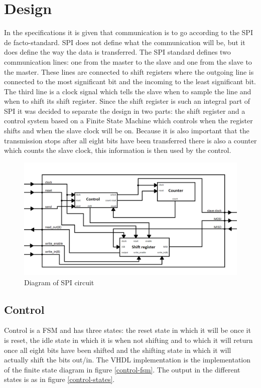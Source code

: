 \documentclass[11pt,twoside,a4paper]{article}
\begin{document}
\section{Design}
In the specifications it is given that communication is to go according to the SPI de facto-standard. SPI does not define what the communication will be, but it does define the way the data is transferred. The SPI standard defines two communication lines: one from the master to the slave and one from the slave to the master. These lines are connected to shift registers where the outgoing line is connected to the most significant bit and the incoming to the least significant bit. The third line is a clock signal which tells the slave when to sample the line and when to shift its shift register. Since the shift register is such an integral part of SPI it was decided to separate the design in two parts: the shift register and a control system based on a Finite State Machine which controls when the register shifts and when the slave clock will be on. Because it is also important that the transmission stops after all eight bits have been transferred there is also a counter which counts the slave clock, this information is then used by the control.

\begin{figure}[H]
\center
\includegraphics[width=14cm]{./spi_diagram}
\caption{Diagram of SPI circuit}
\label{spi-structure}
\end{figure}

\subsection{Control}
Control is a FSM and has three states: the reset state in which it will be once it is reset, the idle state in which it is when not shifting and to which it will return once all eight bits have been shifted and the shifting state in which it will actually shift the bits out/in. The VHDL implementation is the implementation of the finite state diagram in figure \ref{control-fsm}.
The output in the different states is as in figure \ref{control-states}.
\end{document}
